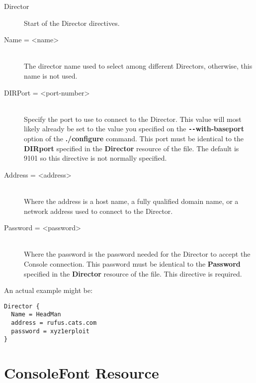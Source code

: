 \begin{description}
\item [Director]
Start of the Director directives.

\item [Name = {\textless}name{\textgreater}] \hfill \\
The director name used to select  among different Directors, otherwise, this
name is not used.

\item [DIRPort = {\textless}port-number{\textgreater}] \hfill \\
Specify the port to use to connect  to the Director. This value will most
likely already be set to the value  you specified on the {\bf
\verb:--:with-baseport} option of the  {\bf ./configure} command. This port must be
identical to the  {\bf DIRport} specified in the {\bf Director} resource of
the  file.  The
default is 9101 so this directive is not normally specified.

\item [Address = {\textless}address{\textgreater}] \hfill \\
Where the address is a host name,  a fully qualified domain name, or a network
address used to connect  to the Director.

\item [Password = {\textless}password{\textgreater}] \hfill \\
Where the password is the  password needed for the Director to accept the
Console connection.  This password must be identical to the {\bf Password}
specified in  the {\bf Director} resource of the
 file. This
directive is required.
\end{description}

An actual example might be:

\footnotesize
\begin{verbatim}
Director {
  Name = HeadMan
  address = rufus.cats.com
  password = xyz1erploit
}
\end{verbatim}
\normalsize

\section{ConsoleFont Resource}

